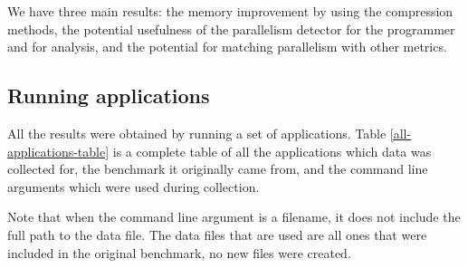 \documentclass[12pt,twoside]{reedthesis}
\begin{document}
		We have three main results: the memory improvement by using the compression methods, the potential usefulness of the parallelism detector for the programmer and for analysis, and the potential for matching parallelism with other metrics.
	
		\subsection{Running applications}
		
		All the results were obtained by running a set of applications.
		Table \ref{all-applications-table} is a complete table of all the applications which data was collected for, the benchmark it originally came from, and the command line arguments which were used during collection. 
		
		Note that when the command line argument is a filename, it does not include the full path to the data file. The data files that are used are all ones that were included in the original benchmark, no new files were created. 
		
\end{document}
